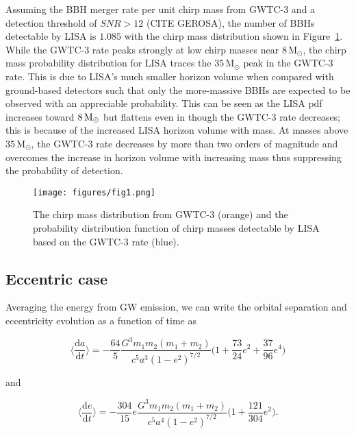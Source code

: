 \documentclass[twocolumn]{aastex631}
\begin{document}
Assuming the BBH merger rate per unit chirp mass from GWTC-3 and a detection threshold of $SNR > 12$ (CITE GEROSA), the number of BBHs detectable by LISA is $1.085$ with the chirp mass distribution shown in Figure~\ref{fig:circ_Mdist}. While the GWTC-3 rate peaks strongly at low chirp masses near $8\,\mathrm{M_{\odot}}$, the chirp mass probability distribution for LISA traces the $35\,\mathrm{M_{\odot}}$ peak in the GWTC-3 rate. This is due to LISA's much smaller horizon volume when compared with ground-based detectors such that only the more-massive BBHs are expected to be observed with an appreciable probability. This can be seen as the LISA pdf increases toward $8\,\rm{M_{\odot}}$ but flattens even in though the GWTC-3 rate decreases; this is because of the increased LISA horizon volume with mass. At masses above $35\,\mathrm{M_{\odot}}$, the GWTC-3 rate decreases by more than two orders of magnitude and overcomes the increase in horizon volume with increasing mass thus suppressing the probability of detection.

\begin{figure}
	\texttt{[image: figures/fig1.png]}
    \caption{The chirp mass distribution from GWTC-3 (orange) and the probability distribution function of chirp masses detectable by LISA based on the GWTC-3 rate (blue).}
    \label{fig:circ_Mdist}
\end{figure}


\subsection{Eccentric case}
\label{sec:ecc}
 Averaging the energy from GW emission, we can write the orbital separation and eccentricity evolution as a function of time as

\begin{equation}
    \Big\langle \frac{\mathrm{d}a}{\mathrm{d}t} \Big\rangle = - \frac{64}{5} \frac{G^3 m_1 m_2 (m_1 + m_2)}{c^5 a^3 (1 - e^2)^{7/2}} \Big(1 + \frac{73}{24} e^2 + \frac{37}{96} e^4 \Big)
    \label{eq:dadt}
\end{equation}

\noindent and 

\begin{equation}
    \Big\langle\frac{\mathrm{d}e}{\mathrm{d}t}\Big\rangle = -\frac{304}{15} e \frac{G^3 m_1 m_2 (m_1 + m_2)}{c^5 a^4 (1-e^2)^{7/2}} \Big( 1 + \frac{121}{304} e^{2}\Big).
    \label{eq:dedt}
\end{equation}
\end{document}
